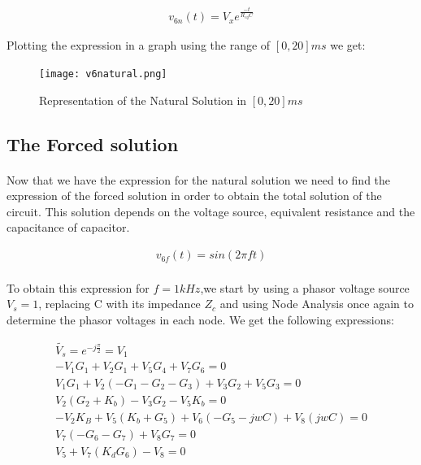 \begin{center}
  \begin{gather*}
    v_{6n}(t)=V_x e^\frac{-t}{R_{eq}C}
  \end{gather*}
\end{center}



\par Plotting the expression in a graph using the range of $[0,20]ms$ we get:

\begin{figure}[h]
  \centering
  \texttt{[image: v6natural.png]}
  \caption{Representation of the Natural Solution in $[0,20]ms$}
\end{figure}




\subsection{The Forced solution} \label{2.4}

\paragraph{} Now that we have the expression for the natural solution we need
to find the expression of the forced solution in order to obtain the total solution of the circuit. This solution depends on the voltage
source, equivalent resistance and the capacitance of capacitor.

\begin{center}
  \begin{gather*}
    v_{6f}(t)= sin(2\pi f t)
  \end{gather*}
\end{center}

\paragraph{} To obtain this expression for $f=1kHz$,we start by using a phasor voltage source $V_s=1$, replacing C with its impedance $Z_c$ and using
Node Analysis once again to determine the phasor voltages in each node. We get the following expressions:

\begin{gather*}
  \widetilde{V_s} = e^{-j\frac{\pi}{2}} = V_1 \\
  -V_1G_1 +V_2G_1 + V_5G_4 + V_7G_6 = 0 \\
  V_1G_1 + V_2(-G_1-G_2-G_3)+V_3G_2+V_5G_3 = 0 \\
  V_2 (G_2 + K_b) -V_3G_2 -V_5K_b = 0 \\
  -V_2K_B+V_5(K_b + G_5) + V_6(-G_5 -jwC) + V_8(jwC) = 0 \\
  V_7 (-G_6-G_7) + V_8G_7 = 0 \\
  V_5 + V_7(K_dG_6) - V_8 = 0 \\
\end{gather*}

